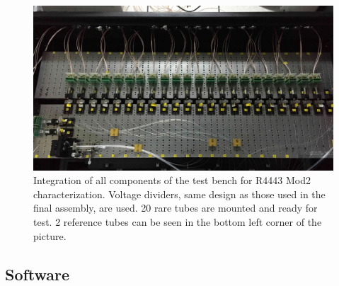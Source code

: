 \documentclass[review,number,sort&compress]{elsarticle}
\begin{document}

\begin{figure}[t]
 \centering
 \includegraphics[width=130mm]{integration3}
\caption{Integration of all components of the test bench for R4443 Mod2 characterization.
Voltage dividers, same design as those used in the final assembly, are used. 
20 rare tubes are mounted and ready for test.
2 reference tubes can be seen in the bottom left corner of the picture. 
}
\label{fig:integrated_testbench}
\end{figure}

\subsection{Software}
\label{sec:software}
\end{document}
